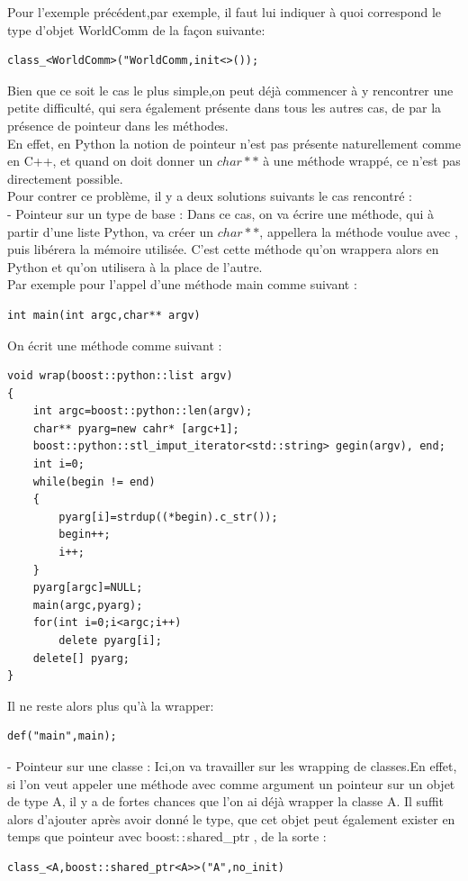 \documentclass[french,12pt]{article}
\begin{document}
Pour l'exemple précédent,par exemple, il faut lui indiquer à quoi correspond le type d'objet WorldComm de la façon suivante:
\begin{lstlisting}
class_<WorldComm>("WorldComm,init<>());
\end{lstlisting} 

Bien que ce soit le cas le plus simple,on peut déjà commencer à y rencontrer une petite difficulté, qui sera également présente dans tous les autres cas, de par la présence de pointeur dans les méthodes.\\
En effet, en Python la notion de pointeur n'est pas présente naturellement comme en C++, et quand on doit donner un $char**$ à une méthode wrappé, ce n'est pas directement possible.\\

Pour contrer ce problème, il y a deux solutions suivants le cas rencontré :\\

- Pointeur sur un type de base : Dans ce cas, on va écrire une méthode, qui à partir d'une liste Python, va créer un $char**$, appellera la méthode voulue avec , puis libérera la mémoire utilisée. C'est cette méthode qu'on wrappera alors en Python et qu'on utilisera à la place de l'autre.\\
Par exemple pour l'appel d'une méthode main comme suivant :
\begin{lstlisting}
int main(int argc,char** argv)
\end{lstlisting}

On écrit une méthode comme suivant :
\begin{lstlisting}
void wrap(boost::python::list argv)
{
	int argc=boost::python::len(argv);
	char** pyarg=new cahr* [argc+1];
	boost::python::stl_imput_iterator<std::string> gegin(argv), end;
	int i=0;	
	while(begin != end)
	{
		pyarg[i]=strdup((*begin).c_str());
		begin++;
		i++;
	}
	pyarg[argc]=NULL;
	main(argc,pyarg);
	for(int i=0;i<argc;i++)
		delete pyarg[i];
	delete[] pyarg;
}	
\end{lstlisting}

Il ne reste alors plus qu'à la wrapper:
\begin{lstlisting}
def("main",main);
\end{lstlisting}

- Pointeur sur une classe : Ici,on va travailler sur les wrapping de classes.En effet, si l'on veut appeler une méthode avec comme argument un pointeur sur un objet de type A, il y a de fortes chances que l'on ai déjà wrapper la classe A.
Il suffit alors d'ajouter après avoir donné le type, que cet objet peut également exister en temps que pointeur avec boost$::$shared\_ptr , de la sorte :
\begin{lstlisting}
class_<A,boost::shared_ptr<A>>("A",no_init)
\end{lstlisting}
\end{document}
